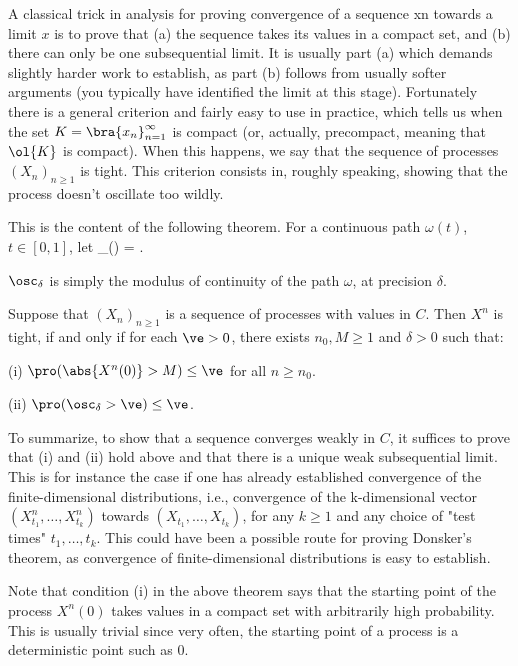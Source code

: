 A classical trick in analysis for proving convergence of a sequence xn towards a limit $x$ is to prove that (a) the sequence takes its values in a compact set, and (b) there can only be one subsequential limit. It is usually part (a) which demands slightly harder work to establish, as part (b) follows from usually softer arguments (you typically have identified the limit at this stage). Fortunately there is a general criterion and fairly easy to use in practice, which tells us when the set $K = \bra{x_n}^\infty_{n=1}$ is compact (or, actually, precompact, meaning that $\ol{K}$ is compact). When this happens, we say that the sequence of processes $(X_n)_{n\geq1}$ is tight. This criterion consists in, roughly speaking, showing that the process doesn't oscillate too wildly.

This is the content of the following theorem. For a continuous path $\omega(t)$, $t \in [0, 1]$, let
\be
\osc_\delta(\omega) = \sup{}.
\ee

$\osc_\delta$ is simply the modulus of continuity of the path $\omega$, at precision $\delta$.

\begin{theorem}\label{thm:osc_pro}
Suppose that $(X_n)_{n\geq1}$ is a sequence of processes with values in $C$. Then $X^n$ is tight, if and only if for each $\ve > 0$, there exists $n_0,M \geq 1$ and $\delta > 0$ such that:
\ben
\item [(i)] $\pro(\abs{X^n(0)} > M) \leq \ve$ for all $n \geq n_0$.
\item [(ii)] $\pro(\osc_\delta > \ve) \leq \ve$.
\een
\end{theorem}

To summarize, to show that a sequence converges weakly in $C$, it suffices to prove that (i) and (ii) hold above and that there is a unique weak subsequential limit. This is for instance the case if one has already established convergence of the finite-dimensional distributions, i.e., convergence of the k-dimensional vector $(X^n_{t_1} ,\dots,X^n_{t_k})$ towards $(X_{t_1} ,\dots,X_{t_k})$, for any $k \geq 1$ and any choice of "test times" $t_1,\dots, t_k$. This could have been a possible route for proving Donsker's theorem, as convergence of finite-dimensional distributions is easy to establish.

Note that condition (i) in the above theorem says that the starting point of the process $X^n(0)$ takes values in a compact set with arbitrarily high probability. This is usually trivial since very often, the starting point of a process is a deterministic point such as 0.

